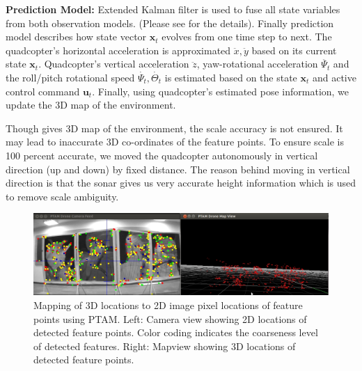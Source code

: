 \textbf{Prediction Model:} Extended Kalman filter is used to fuse all state
variables from both observation models. (Please see \cite{engel} for the
details). Finally prediction model describes how state vector $\mathbf{x}_t$
evolves from one time step to next. The quadcopter’s horizontal acceleration is
approximated $\ddot{x}, \ddot{y}$ based on its current state $\mathbf{x}_t$.
Quadcopter's vertical acceleration   $\ddot{z}$, yaw-rotational 
acceleration $\ddot{{\Psi}_t}$ and the roll/pitch rotational speed
$\dot{{\Psi}_t}, \dot{{\Theta}_t}$ is estimated based on the state
$\mathbf{x}_t$ and  active control command $\mathbf{u}_t$. Finally, using quadcopter's 
estimated pose information, we update the 3D map of the environment.
 
Though \cite{engel}  gives 3D map of the environment, the scale accuracy is not
ensured. It may lead to inaccurate 3D co-ordinates of the feature points. To
ensure scale is 100 percent accurate, we moved the quadcopter autonomously in
vertical direction (up and down) by fixed distance. The reason behind moving in
vertical direction is that the sonar gives us very accurate height information 
which is used to remove scale ambiguity.

\begin{figure}[t!]
\centering
\includegraphics[width=\linewidth]{images/3D_2D}
\caption[Creation of 3D map]{Mapping of 3D locations to 2D image pixel locations
of feature points using PTAM. Left: Camera view showing 2D locations of detected feature points.
Color coding indicates the coarseness level of detected features. Right: Mapview
showing 3D locations of detected feature points.}
\label{fig:ptam_output}
\end{figure}

